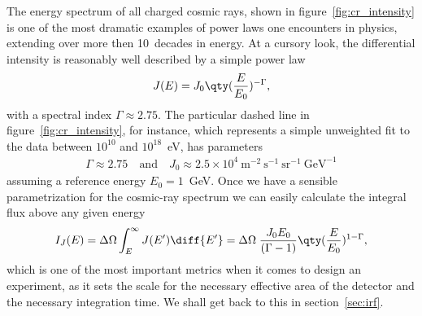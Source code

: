 The energy spectrum of all charged cosmic rays, shown in figure~\ref{fig:cr_intensity}
is one of the most dramatic examples of power laws one encounters in physics,
extending over more then 10~decades in energy. At a cursory look, the differential
intensity is reasonably well described by a simple power law
\begin{align}
  J(E) = J_0 \qty(\frac{E}{E_0})^{-\Gamma},
\end{align}
with a spectral index $\Gamma \approx 2.75$. The particular dashed line in
figure~\ref{fig:cr_intensity}, for instance, which represents a simple unweighted
fit to the data between $10^{10}$ and $10^{18}$~eV, has parameters
\begin{align*}
  \Gamma \approx 2.75 \quad\text{and}\quad
  J_0 \approx 2.5 \times 10^4~\text{m}^{-2}~\text{s}^{-1}~\text{sr}^{-1}~\text{GeV}^{-1}
\end{align*}
assuming a reference energy $E_0 = 1$~GeV. Once we have a sensible parametrization
for the cosmic-ray spectrum we can easily calculate the integral flux above any
given energy
\begin{align}\label{eq:cr_integral_flux}
  I_J(E) = \Delta\Omega \int_E^\infty J(E') \diff{E'} =
  \Delta\Omega \; \frac{J_0 E_0}{(\Gamma - 1)} \qty(\frac{E}{E_0})^{1 - \Gamma},
\end{align}
which is one of the most important metrics when it comes to design an experiment,
as it sets the scale for the necessary effective area of the detector and the
necessary integration time. We shall get back to this in section~\ref{sec:irf}.

\begin{marginfigure}
  
  \caption{Cosmic-ray all-particle integral flux above a given energy. This particular
  power law assumes the parametrization from the best fit in figure~\ref{fig:cr_intensity},
  and a field of view of $\pi$~sr, or  of the sky, corresponding to
  a perfect planar detector.}
  \label{fig:cr_integral_flux}
\end{marginfigure}

